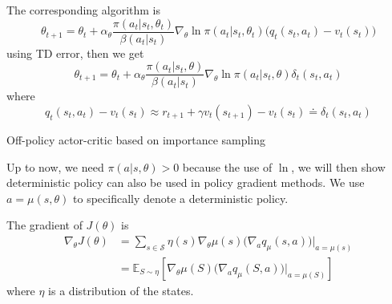 \documentclass[10pt]{elegantbook}
\begin{document}
The corresponding algorithm is
\[
    \theta_{t+1}=\theta_{t}+\alpha_{\theta}\frac{\pi(a_{t}|s_{t},\theta_{t})}{\beta(a_{t}|s_{t})}\nabla_{\theta}\ln\pi(a_{t}|s_{t},\theta_{t})\bigl(q_{t}(s_{t},a_{t})-v_{t}(s_{t})\bigr)
\]
using TD error, then we get
\[
    \theta_{t+1}=\theta_{t}+\alpha_{\theta}\frac{\pi(a_{t}|s_{t},\theta)}{\beta(a_{t}|s_{t})}\nabla_{\theta}\ln\pi(a_{t}|s_{t},\theta)\delta_{t}(s_{t},a_{t})
\]
where
\[
    q_{t}(s_{t},a_{t})-v_{t}(s_{t})\approx r_{t+1}+\gamma v_{t}(s_{t+1})-v_{t}(s_{t})\doteq\delta_{t}(s_{t},a_{t})
\]

\vspace{\baselineskip}

\begin{algorithm}[H]
\caption{Off-policy actor-critic based on importance sampling}

\end{algorithm}

\vspace{\baselineskip}

Up to now, we need $\pi(a | s, \theta) > 0$ because the use of $\ln$, we will then show deterministic policy can also be used in policy gradient methods.
We use $a = \mu(s, \theta)$ to specifically denote a deterministic policy.

\begin{theorem} \label{theorem:deterministic_policy_gradient_theorem}
    The gradient of $J(\theta)$ is
    \begin{equation}
        \begin{aligned}
            \nabla_{\theta}J(\theta) &= \sum_{s\in{\mathcal{S}}}\eta(s)\nabla_{\theta}\mu(s)\big(\nabla_{a}q_{\mu}(s,a)\big)\big|_{a=\mu(s)} \\
            &= \mathbb{E}_{S\sim\eta}\left[\nabla_{\theta}\mu(S)\big(\nabla_{a}q_{\mu}(S,a)\big)|_{a=\mu(S)}\right]
        \end{aligned}
    \end{equation}
    where $\eta$ is a distribution of the states.
\end{theorem}
\end{document}
